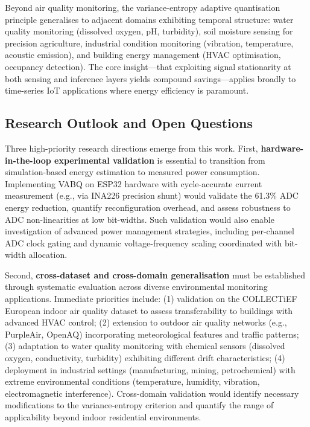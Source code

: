 Beyond air quality monitoring, the variance-entropy adaptive quantisation principle generalises to adjacent domains exhibiting temporal structure: water quality monitoring (dissolved oxygen, pH, turbidity), soil moisture sensing for precision agriculture, industrial condition monitoring (vibration, temperature, acoustic emission), and building energy management (HVAC optimisation, occupancy detection). The core insight---that exploiting signal stationarity at both sensing and inference layers yields compound savings---applies broadly to time-series IoT applications where energy efficiency is paramount.

\subsection{Research Outlook and Open Questions}
\label{sec:conc_outlook}

Three high-priority research directions emerge from this work. First, \textbf{hardware-in-the-loop experimental validation} is essential to transition from simulation-based energy estimation to measured power consumption. Implementing VABQ on ESP32 hardware with cycle-accurate current measurement (e.g., via INA226 precision shunt) would validate the 61.3\% ADC energy reduction, quantify reconfiguration overhead, and assess robustness to ADC non-linearities at low bit-widths. Such validation would also enable investigation of advanced power management strategies, including per-channel ADC clock gating and dynamic voltage-frequency scaling coordinated with bit-width allocation.

Second, \textbf{cross-dataset and cross-domain generalisation} must be established through systematic evaluation across diverse environmental monitoring applications. Immediate priorities include: (1) validation on the COLLECTiEF European indoor air quality dataset to assess transferability to buildings with advanced HVAC control; (2) extension to outdoor air quality networks (e.g., PurpleAir, OpenAQ) incorporating meteorological features and traffic patterns; (3) adaptation to water quality monitoring with chemical sensors (dissolved oxygen, conductivity, turbidity) exhibiting different drift characteristics; (4) deployment in industrial settings (manufacturing, mining, petrochemical) with extreme environmental conditions (temperature, humidity, vibration, electromagnetic interference). Cross-domain validation would identify necessary modifications to the variance-entropy criterion and quantify the range of applicability beyond indoor residential environments.

